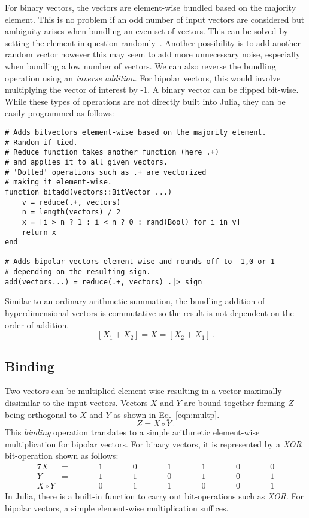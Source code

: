 For binary vectors, the vectors are element-wise bundled based on the majority element. This is no problem if an odd number of input vectors are considered but ambiguity arises when bundling an even set of vectors. This can be solved by setting the element in question randomly~\cite{binBund}. Another possibility is to add another random vector however this may seem to add more unnecessary noise, especially when bundling a low number of vectors. We can also reverse the bundling operation using an \textit{inverse addition}. For bipolar vectors, this would involve multiplying the vector of interest by -1. A binary vector can be flipped bit-wise. While these types of operations are not directly built into Julia, they can be easily programmed as follows:

\begin{verbatim}
# Adds bitvectors element-wise based on the majority element.
# Random if tied.
# Reduce function takes another function (here .+)
# and applies it to all given vectors.
# 'Dotted' operations such as .+ are vectorized
# making it element-wise.
function bitadd(vectors::BitVector ...)
    v = reduce(.+, vectors)            
    n = length(vectors) / 2
    x = [i > n ? 1 : i < n ? 0 : rand(Bool) for i in v]
    return x
end

# Adds bipolar vectors element-wise and rounds off to -1,0 or 1
# depending on the resulting sign.
add(vectors...) = reduce(.+, vectors) .|> sign
\end{verbatim}
Similar to an ordinary arithmetic summation, the bundling addition of hyperdimensional vectors is commutative so the result is not dependent on the order of addition.
\begin{equation}
    \label{eqn:sumcom}
    [X_{1} + X_{2}] = X = [X_{2} + X_{1}]\,.
\end{equation}
\subsection*{Binding} \label{sssec:mult}
Two vectors can be multiplied element-wise resulting in a vector maximally dissimilar to the input vectors. Vectors $X$ and $Y$ are bound together forming $Z$ being orthogonal to $X$ and $Y$ as shown in Eq.~\ref{eqn:multp}.
\begin{equation}
    \label{eqn:multp}
    Z = X \circ Y\,.
\end{equation}
This \textit{binding} operation translates to a simple arithmetic element-wise multiplication for bipolar vectors. For binary vectors, it is represented by a \textit{XOR} bit-operation shown as follows:
\begin{alignat*}{7}
    X &= && \qquad 1 && \qquad 0 && \qquad 1 && \qquad 1 && \qquad 0 && \qquad 0 \\
    Y &= && \qquad 1 && \qquad 1 && \qquad 0 && \qquad 1 && \qquad 0 && \qquad 1 \\
    \hline
    X \circ Y &= && \qquad 0 && \qquad 1 && \qquad 1 &&  \qquad 0 && \qquad 0 && \qquad 1
\end{alignat*}
In Julia, there is a built-in function to carry out bit-operations such as \textit{XOR}. For bipolar vectors, a simple element-wise multiplication suffices.

